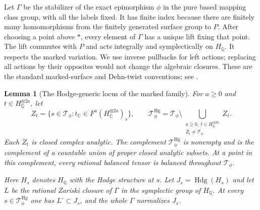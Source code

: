\documentclass[11pt]{article}
\newcommand{\Q}{\mathbb Q}
\newcommand{\C}{\mathbb C}
\theoremstyle{plain}
\newtheorem{lemma}[theorem]{Lemma}
\theoremstyle{definition}
\theoremstyle{remark}
\numberwithin{equation}{section}
\begin{document}
Let $\Gamma$ be the stabilizer of the exact epimorphism $\phi$ in the
pure based mapping class group, with all the labels fixed.  It has
finite index because there are finitely many homomorphisms from the
finitely generated surface group to $P$.  After choosing a point above
$*$, every element of $\Gamma$ has a unique lift fixing that point.
The lift commutes with $P$ and acts integrally and symplectically on
$H_\Q$.  It respects the marked variation.  We use inverse pullbacks
for left actions; replacing all actions by their opposites would not
change the algebraic closures.  These are the standard marked-surface
and Dehn-twist conventions; see
\cite[Chapters~2, 3, and~6]{FarbMargalit2012}.

\begin{lemma}[The Hodge-generic locus of the marked family]
\label{p4:generic-tensors}
For $a\ge0$ and $t\in H_\Q^{\otimes 2a}$, let
\[
 Z_t=\{s\in\mathcal T_\phi:
       t_\C\in F^a(H_\C^{\otimes 2a})_s\},\qquad
 \mathcal T_\phi^{\mathrm{Hg}}
 =\mathcal T_\phi\setminus
   \bigcup_{\substack{a\ge0,\ t\in H_\Q^{\otimes 2a}\\
                       Z_t\ne\mathcal T_\phi}}Z_t.
\]
Each $Z_t$ is closed complex analytic.  The complement
$\mathcal T_\phi^{\mathrm{Hg}}$ is nonempty and is the complement of a
countable union of proper closed analytic subsets.  At a point in this
complement, every rational balanced tensor is balanced throughout
$\mathcal T_\phi$.

Here $H_s$ denotes $H_\Q$ with the Hodge structure at $s$.
Let $J_s=\operatorname{Hdg}(H_s)$ and let $L$ be the rational Zariski
closure of $\Gamma$ in the symplectic group of $H_\Q$.  At every
$s\in\mathcal T_\phi^{\mathrm{Hg}}$ one has
$L^\circ\subset J_s$, and the whole $\Gamma$ normalizes $J_s$.
\end{lemma}
\end{document}
